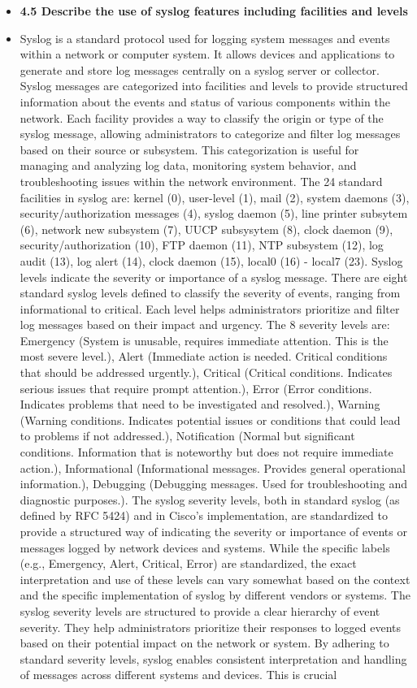 \documentclass{article}
\begin{document}
\begin{itemize}
  \item \textbf{4.5 Describe the use of syslog features including facilities and levels}
  	\item[] Syslog is a standard protocol used for logging system messages and events within a network or computer system. It allows devices and applications to generate and store log messages centrally on a syslog server or collector. Syslog messages are categorized into facilities and levels to provide structured information about the events and status of various components within the network. Each facility provides a way to classify the origin or type of the syslog message, allowing administrators to categorize and filter log messages based on their source or subsystem. This categorization is useful for managing and analyzing log data, monitoring system behavior, and troubleshooting issues within the network environment. The 24 standard facilities in syslog are: kernel (0), user-level (1), mail (2), system daemons (3), security/authorization messages (4), syslog daemon (5), line printer subsytem (6), network new subsystem (7), UUCP subsysytem (8), clock daemon (9), security/authorization (10), FTP daemon (11), NTP subsystem (12), log audit (13), log alert (14), clock daemon (15), local0 (16) - local7 (23). Syslog levels indicate the severity or importance of a syslog message. There are eight standard syslog levels defined to classify the severity of events, ranging from informational to critical. Each level helps administrators prioritize and filter log messages based on their impact and urgency. The 8 severity levels are: Emergency (System is unusable, requires immediate attention. This is the most severe level.), Alert (Immediate action is needed. Critical conditions that should be addressed urgently.), Critical (Critical conditions. Indicates serious issues that require prompt attention.), Error (Error conditions. Indicates problems that need to be investigated and resolved.), Warning (Warning conditions. Indicates potential issues or conditions that could lead to problems if not addressed.), Notification (Normal but significant conditions. Information that is noteworthy but does not require immediate action.), Informational (Informational messages. Provides general operational information.), Debugging (Debugging messages. Used for troubleshooting and diagnostic purposes.). The syslog severity levels, both in standard syslog (as defined by RFC 5424) and in Cisco's implementation, are standardized to provide a structured way of indicating the severity or importance of events or messages logged by network devices and systems. While the specific labels (e.g., Emergency, Alert, Critical, Error) are standardized, the exact interpretation and use of these levels can vary somewhat based on the context and the specific implementation of syslog by different vendors or systems. The syslog severity levels are structured to provide a clear hierarchy of event severity. They help administrators prioritize their responses to logged events based on their potential impact on the network or system. By adhering to standard severity levels, syslog enables consistent interpretation and handling of messages across different systems and devices. This is crucial 
\end{itemize}
\end{document}
